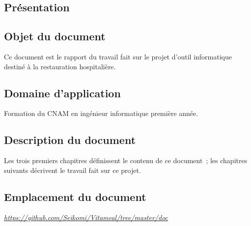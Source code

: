 \textcolor[RGB]{46, 116, 181}{\chapter{Présentation}}
\section{Objet du document}
Ce document est le rapport du travail fait sur le projet d'outil informatique destiné à la restauration hospitalière.

\section{Domaine d'application}
Formation du CNAM en ingénieur informatique première année.

\section{Description du document}
Les trois premiers chapitres définissent le contenu de ce document~; les chapitres suivants décrivent le travail fait sur ce projet.

\section{Emplacement du document}
\href{https://github.com/Seikomi/Vitameal/tree/master/doc}{\emph{https://github.com/Seikomi/Vitameal/tree/master/doc}}

